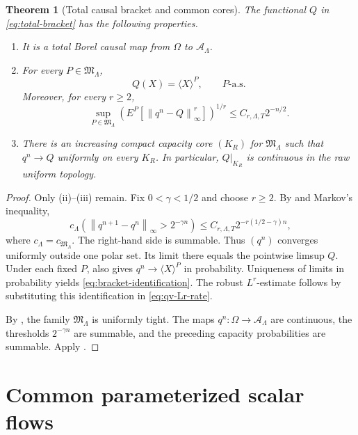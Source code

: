 \documentclass[11pt,reqno]{amsart}
\theoremstyle{plain}
\newtheorem{theorem}{Theorem}[section]
\theoremstyle{definition}
\newcommand{\cA}{\mathcal A}
\newcommand{\norm}[1]{\left\lVert #1\right\rVert}
\begin{document}
\begin{theorem}[Total causal bracket and common cores]
\label{thm:causal-bracket}
The functional \(Q\) in \eqref{eq:total-bracket} has the following
properties.
\begin{enumerate}[leftmargin=2.2em,label=(\roman*)]
  \item It is a total Borel causal map from \(\Omega\) to
  \(\cA_\Lambda\).

  \item For every \(P\in\mathfrak M_\Lambda\),
  \begin{equation}\label{eq:bracket-identification}
    Q(X)=\langle X\rangle^P,
    \qquad P\text{-a.s.}
  \end{equation}
  Moreover, for every \(r\ge2\),
  \[
    \sup_{P\in\mathfrak M_\Lambda}
    \left(
      E^P\left[\norm{q^n-Q}_\infty^r\right]
    \right)^{1/r}
    \le C_{r,\Lambda,T}2^{-n/2}.
  \]

  \item There is an increasing compact capacity core \((K_R)\) for
  \(\mathfrak M_\Lambda\) such that \(q^n\to Q\) uniformly on every
  \(K_R\).  In particular, \(Q|_{K_R}\) is continuous in the raw uniform
  topology.
\end{enumerate}
\end{theorem}

\begin{proof}
Only (ii)--(iii) remain.  Fix \(0<\gamma<1/2\) and choose \(r\ge2\).
By  and Markov's inequality,
\[
  c_\Lambda\left(
    \norm{q^{n+1}-q^n}_\infty>2^{-\gamma n}
  \right)
  \le C_{r,\Lambda,T}2^{-r(1/2-\gamma)n},
\]
where \(c_\Lambda=c_{\mathfrak M_\Lambda}\).  The right-hand side is
summable.  Thus \((q^n)\) converges uniformly outside one polar set.  Its
limit there equals the pointwise limsup \(Q\).  Under each fixed \(P\),
 also gives
\(q^n\to\langle X\rangle^P\) in probability.  Uniqueness of limits in
probability yields \eqref{eq:bracket-identification}.  The robust
\(L^r\)-estimate follows by substituting this identification in
\eqref{eq:qv-Lr-rate}.

By , the family \(\mathfrak M_\Lambda\) is
uniformly tight.  The maps \(q^n:\Omega\to\cA_\Lambda\) are continuous, the
thresholds \(2^{-\gamma n}\) are summable, and the preceding capacity
probabilities are summable.  Apply .
\end{proof}

\section{Common parameterized scalar flows}
\label{sec:flow}
\end{document}
